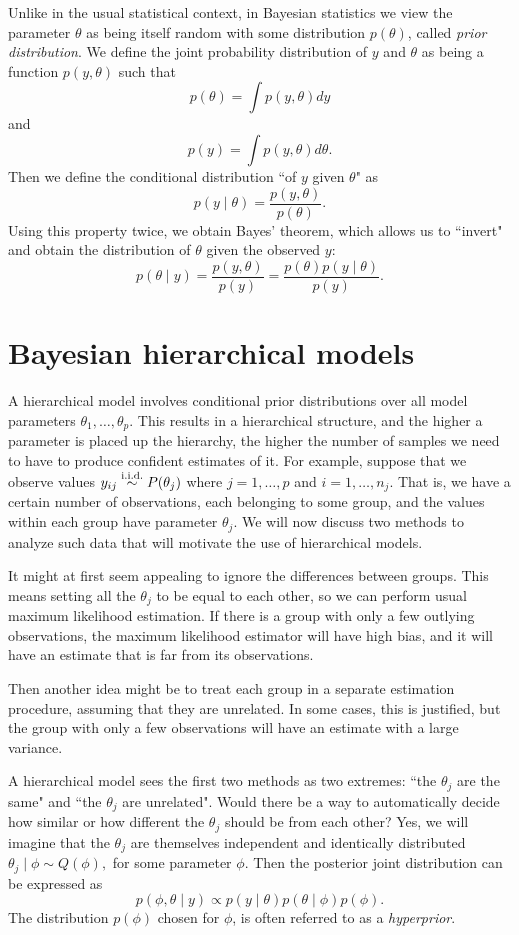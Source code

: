 \documentclass[a4paper, 11pt, oneside]{report}
\newcommand{\iid}{\stackrel{\textmd{i.i.d.}}{\sim}}
\newcommand{\1}{\mathds{1}}
\begin{document}
Unlike in the usual statistical context, in Bayesian statistics we view the parameter $\theta$ as
being itself random with some distribution $p(\theta)$, called \emph{prior distribution}. We define the joint
probability distribution of $y$ and $\theta$ as being a function $p(y,\theta)$ such that
\[p(\theta) = \int p(y,\theta) dy\]
and
\[p(y)  = \int p(y,\theta) d\theta.\]
Then we define the conditional distribution ``of $y$ given $\theta$" as
\[
	p(y \mid \theta) = \frac{p(y,\theta)}{p(\theta)}.
\]
Using this property twice, we obtain Bayes' theorem, which allows us to ``invert"
and obtain the distribution of $\theta$ given the observed $y$:
\[ p(\theta \mid y) = \frac{p(y,\theta)}{p(y)} = \frac{p(\theta)p(y \mid \theta)}{p(y)}. \]

\section{Bayesian hierarchical models}
A hierarchical model involves conditional prior distributions over all model parameters
$\theta_1, \dots, \theta_p$. This results in a hierarchical structure, and the
higher a parameter is placed
up the hierarchy, the higher the number of samples we need to have to produce
confident estimates of it.
For example, suppose that we observe values $y_{ij} \iid P(\theta_j)$ where $j=1,\dots,p$ and
$i=1,\dots,n_j$. That is, we have a certain number of observations,
each belonging to some group, and the values within each group have
parameter $\theta_j$. We will now discuss two methods to analyze such data
that will motivate the use of hierarchical models.

It might at first seem appealing to ignore the differences between groups. This
means setting all the $\theta_j$ to be equal to each other, so we can perform
usual maximum likelihood estimation. If there is a group with only a few
outlying observations, the maximum likelihood estimator will have high bias, and it will have an estimate that is far from its observations.

Then another idea might be to treat each group in a separate estimation procedure, assuming
that they are unrelated. In some cases, this is
justified, but the group with only a few
observations will have an estimate with a large variance.

A hierarchical model sees the first two methods as two
extremes: ``the $\theta_j$ are the same" and ``the $\theta_j$ are unrelated".
Would there be a way to automatically decide how similar or how different the $\theta_j$ should be from each other?
Yes, we will imagine that the $\theta_j$ are themselves independent and identically distributed
$\theta_j \mid \phi \sim Q(\phi),$ for some parameter $\phi.$ Then the posterior
joint distribution can be expressed as
\[p(\phi, \theta \mid y) \propto p(y \mid \theta) p(\theta \mid \phi) p(\phi).\]
The distribution $p(\phi)$ chosen for $\phi$, is often
referred to as a \emph{hyperprior}.
\end{document}
